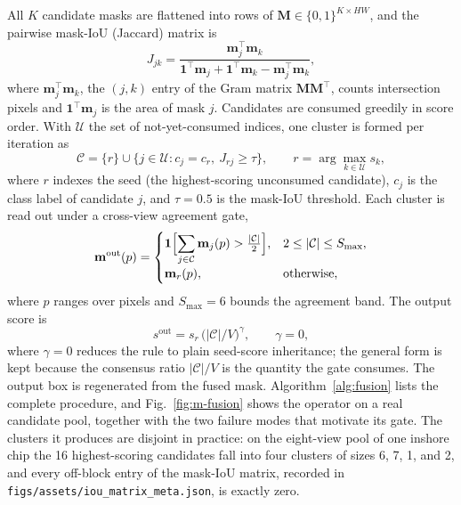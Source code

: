 All $K$ candidate masks are flattened into rows of $\mathbf{M}\in\{0,1\}^{K\times HW}$, and the pairwise mask-IoU (Jaccard) matrix is
\begin{equation}\label{eq:iou}
J_{jk}=\frac{\mathbf{m}_j^{\top}\mathbf{m}_k}
{\mathbf{1}^{\top}\mathbf{m}_j+\mathbf{1}^{\top}\mathbf{m}_k-\mathbf{m}_j^{\top}\mathbf{m}_k},
\end{equation}
where $\mathbf{m}_j^{\top}\mathbf{m}_k$, the $(j,k)$ entry of the Gram matrix $\mathbf{M}\mathbf{M}^{\top}$, counts intersection pixels and $\mathbf{1}^{\top}\mathbf{m}_j$ is the area of mask $j$. Candidates are consumed greedily in score order. With $\mathcal{U}$ the set of not-yet-consumed indices, one cluster is formed per iteration as
\begin{equation}\label{eq:cluster}
\mathcal{C}=\{r\}\cup\bigl\{j\in\mathcal{U}: c_j=c_r,\ J_{rj}\ge\tau\bigr\},
\qquad r=\arg\max_{k\in\mathcal{U}}s_k,
\end{equation}
where $r$ indexes the seed (the highest-scoring unconsumed candidate), $c_j$ is the class label of candidate $j$, and $\tau=0.5$ is the mask-IoU threshold. Each cluster is read out under a cross-view agreement gate,
\begin{equation}\label{eq:fuse}
\mathbf{m}^{\mathrm{out}}(p)=
\begin{cases}
\mathbf{1}\Bigl[\displaystyle\sum_{j\in\mathcal{C}}\mathbf{m}_j(p)>\tfrac{|\mathcal{C}|}{2}\Bigr],
& 2\le|\mathcal{C}|\le S_{\max},\\[8pt]
\mathbf{m}_r(p), & \text{otherwise},
\end{cases}
\end{equation}
where $p$ ranges over pixels and $S_{\max}=6$ bounds the agreement band. The output score is
\begin{equation}\label{eq:score}
s^{\mathrm{out}}=s_r\,\bigl(|\mathcal{C}|/V\bigr)^{\gamma},
\qquad \gamma=0,
\end{equation}
where $\gamma=0$ reduces the rule to plain seed-score inheritance; the general form is kept because the consensus ratio $|\mathcal{C}|/V$ is the quantity the gate consumes. The output box is regenerated from the fused mask. Algorithm~\ref{alg:fusion} lists the complete procedure, and Fig.~\ref{fig:m-fusion} shows the operator on a real candidate pool, together with the two failure modes that motivate its gate. The clusters it produces are disjoint in practice: on the eight-view pool of one inshore chip the 16 highest-scoring candidates fall into four clusters of sizes 6, 7, 1, and 2, and every off-block entry of the mask-IoU matrix, recorded in \texttt{figs/assets/iou\_matrix\_meta.json}, is exactly zero.

